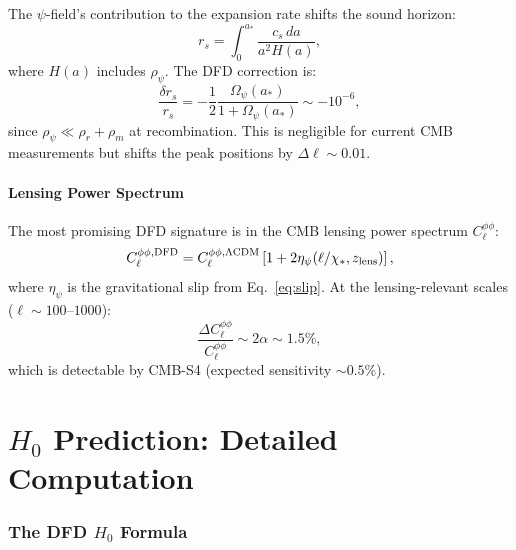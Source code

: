 \documentclass[11pt,a4paper]{article}
\theoremstyle{remark}
\begin{document}
The $\psi$-field's contribution to the expansion rate shifts the sound horizon:
\begin{equation}
r_s = \int_0^{a_*} \frac{c_s\,da}{a^2 H(a)},
\end{equation}
where $H(a)$ includes $\rho_\psi$. The DFD correction is:
\begin{equation}
\frac{\delta r_s}{r_s} = -\frac{1}{2}\frac{\Omega_\psi(a_*)}{1 + \Omega_\psi(a_*)} \sim -10^{-6},
\end{equation}
since $\rho_\psi \ll \rho_r + \rho_m$ at recombination. This is negligible
for current CMB measurements but shifts the peak positions by $\Delta\ell \sim 0.01$.

\subsection{Lensing Power Spectrum}

The most promising DFD signature is in the CMB lensing power spectrum $C_\ell^{\phi\phi}$:
\begin{equation}
C_\ell^{\phi\phi,\rm DFD} = C_\ell^{\phi\phi,\Lambda\rm CDM}
\left[1 + 2\eta_\psi(\ell/\chi_*, z_{\rm lens})\right],
\end{equation}
where $\eta_\psi$ is the gravitational slip from Eq.~\eqref{eq:slip}.
At the lensing-relevant scales ($\ell \sim 100$--$1000$):
\begin{equation}
\frac{\Delta C_\ell^{\phi\phi}}{C_\ell^{\phi\phi}} \sim 2\alpha \sim 1.5\%,
\end{equation}
which is detectable by CMB-S4 (expected sensitivity $\sim 0.5\%$).


\newpage
\part{$H_0$ Prediction: Detailed Computation}
\label{part:H0}

\section{The DFD $H_0$ Formula}
\end{document}

